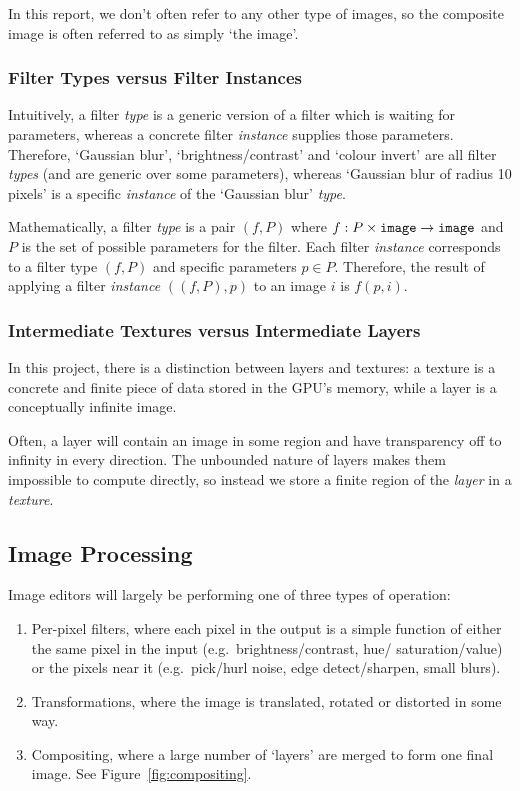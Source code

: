 \documentclass[12pt]{article}
\begin{document}
In this report, we don't often refer to any other type of images, so the composite image is often
referred to as simply `the image'.

\subsubsection{Filter Types versus Filter Instances}

Intuitively, a filter \emph{type} is a generic version of a filter which is waiting for parameters,
whereas a concrete filter \emph{instance} supplies those parameters.  Therefore, `Gaussian blur',
`brightness/contrast' and `colour invert' are all filter \emph{types} (and are generic over some
parameters), whereas `Gaussian blur of radius 10 pixels' is a specific \emph{instance} of the
`Gaussian blur' \emph{type}.

Mathematically, a filter \emph{type} is a pair $(f, P)$ where $f: P \times \verb|image| \rightarrow
\verb|image|$ and $P$ is the set of possible parameters for the filter.  Each filter \emph{instance}
corresponds to a filter type $(f, P)$ and specific parameters $p \in P$.  Therefore, the result of
applying a filter \emph{instance} $((f, P), p)$ to an image $i$ is $f(p, i)$.

\subsubsection{Intermediate Textures versus Intermediate Layers}

In this project, there is a distinction between layers and textures: a texture is a concrete and
finite piece of data stored in the GPU's memory, while a layer is a conceptually infinite image.

Often, a layer will contain an image in some region and have transparency off to infinity in every
direction.  The unbounded nature of layers makes them impossible to compute directly, so instead we
store a finite region of the \emph{layer} in a \emph{texture}.

\subsection{Image Processing}

Image editors will largely be performing one of three types of operation:

\begin{enumerate}
    \item Per-pixel filters, where each pixel in the output is a simple function of either the same
        pixel in the input (e.g.\ brightness/contrast, hue/ saturation/value) or the pixels near it
        (e.g.\ pick/hurl noise, edge detect/sharpen, small blurs).
    \item Transformations, where the image is translated, rotated or distorted in some way.
    \item Compositing, where a large number of `layers' are merged to form one final image.  See
        Figure~\ref{fig:compositing}.
\end{enumerate}
\end{document}
